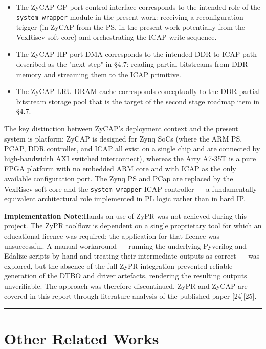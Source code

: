 \begin{itemize}
  \item The ZyCAP GP-port control interface corresponds to the intended role of the \texttt{system\_wrapper} module in the present work: receiving a reconfiguration trigger (in ZyCAP from the PS, in the present work potentially from the VexRiscv soft-core) and orchestrating the ICAP write sequence.
  \item The ZyCAP HP-port DMA corresponds to the intended DDR-to-ICAP path described as the "next step" in §4.7: reading partial bitstreams from DDR memory and streaming them to the ICAP primitive.
  \item The ZyCAP LRU DRAM cache corresponds conceptually to the DDR partial bitstream storage pool that is the target of the second stage roadmap item in §4.7.
\end{itemize}
The key distinction between ZyCAP's deployment context and the present system is platform: ZyCAP is designed for Zynq SoCs (where the ARM PS, PCAP, DDR controller, and ICAP all exist on a single chip and are connected by high-bandwidth AXI switched interconnect), whereas the Arty A7-35T is a pure FPGA platform with no embedded ARM core and with ICAP as the only available configuration port. The Zynq PS and PCap are replaced by the VexRiscv soft-core and the \texttt{system\_wrapper} ICAP controller — a fundamentally equivalent architectural role implemented in PL logic rather than in hard IP.

\begin{mdframed}[style=impnote]
\textbf{Implementation Note:}\quad Hands-on use of ZyPR was not achieved during this project. The ZyPR toolflow is dependent on a single proprietary tool for which an educational licence was required; the application for that licence was unsuccessful. A manual workaround — running the underlying Pyverilog and Edalize scripts by hand and treating their intermediate outputs as correct — was explored, but the absence of the full ZyPR integration prevented reliable generation of the DTBO and driver artefacts, rendering the resulting outputs unverifiable. The approach was therefore discontinued. ZyPR and ZyCAP are covered in this report through literature analysis of the published paper [24][25].
\end{mdframed}

\vspace{0.4em}\hrule\vspace{0.4em}

\section{Other Related Works}

